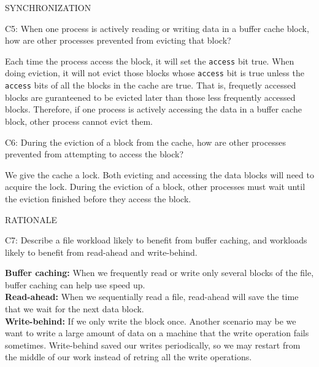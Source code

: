 \begin{aspect}{SYNCHRONIZATION}
  \begin{qc}
    C5: When one process is actively reading or writing data in a
    buffer cache block, how are other processes prevented from evicting
    that block?
  \end{qc}
  Each time the process access the block, it will set the \lstinline{access} bit true. When doing eviction, it will not evict those blocks whose \lstinline{access} bit is true unless the \lstinline{access} bits of all the blocks in the cache are true. That is, frequetly accessed blocks are guranteened to be evicted later than those less frequently accessed blocks. Therefore, if one process is actively accessing the data in a buffer cache block, other process cannot evict them.
  \begin{qc}
    C6: During the eviction of a block from the cache, how are other
    processes prevented from attempting to access the block?
  \end{qc}
  We give the cache a lock. Both evicting and accessing the data blocks will need to acquire the lock. During the eviction of a block, other processes must wait until the eviction finished before they access the block.
\end{aspect}

\begin{aspect}{RATIONALE}
  \begin{qc}
    C7: Describe a file workload likely to benefit from buffer caching,
    and workloads likely to benefit from read-ahead and write-behind.
  \end{qc}
  \textbf{Buffer caching:} When we frequently read or write only several blocks of the file, buffer caching can help use speed up.\\
  \textbf{Read-ahead:} When we sequentially read a file, read-ahead will save the time that we wait for the next data block.\\
  \textbf{Write-behind:} If we only write the block once. Another scenario may be we want to write a large amount of data on a machine that the write operation fails sometimes. Write-behind saved our writes periodically, so we may restart from the middle of our work instead of retring all the write operations.
\end{aspect}